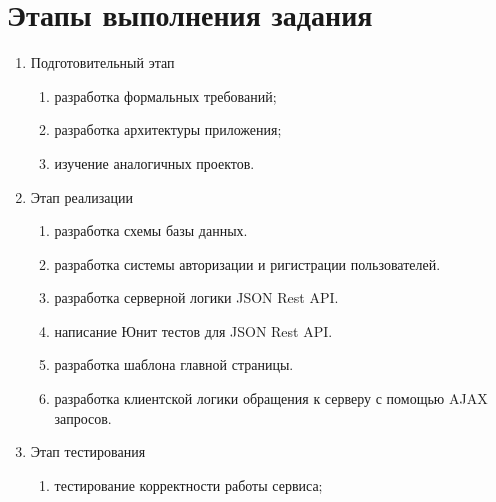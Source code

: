 \section{Этапы выполнения задания}
\label{sec:practice:task_steps}

\begin{enumerate}
  \item Подготовительный этап
  \begin{enumerate}
    \item разработка формальных требований;
    \item разработка архитектуры приложения;
    \item изучение аналогичных проектов. 
  \end{enumerate}
  
  \item Этап реализации
  \begin{enumerate}
    \item разработка схемы базы данных.
    \item разработка системы авторизации и ригистрации пользователей.
    \item разработка серверной логики JSON Rest API.
    \item написание Юнит тестов для JSON Rest API.
    \item разработка шаблона главной страницы.
    \item разработка клиентской логики обращения к серверу с помощью AJAX запросов.
  \end{enumerate}

  \item Этап тестирования
  \begin{enumerate}
    \item тестирование корректности работы сервиса;
  \end{enumerate}
\end{enumerate}

